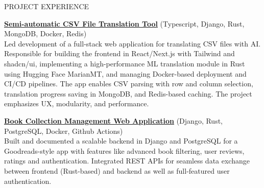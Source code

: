 \documentclass{resume} %
\begin{document}
\begin{rSection}{PROJECT EXPERIENCE}
\vspace{-1.25em}

\item \textbf{\href{https://github.com/Kerciu/csv-translation-tool} {Semi-automatic CSV File Translation Tool}} {(Typescript, Django, Rust, MongoDB, Docker, Redis)}\\  
Led development of a full-stack web application for translating CSV files with AI. Responsible for building the frontend in React/Next.js with Tailwind and shadcn/ui, implementing a high-performance ML translation module in Rust using Hugging Face MarianMT, and managing Docker-based deployment and CI/CD pipelines. The app enables CSV parsing with row and column selection, translation progress saving in MongoDB, and Redis-based caching. The project emphasizes UX, modularity, and performance.



\item \textbf{\href{https://github.com/Kerciu/book-management-app}{Book Collection Management Web Application}} {(Django, Rust, PostgreSQL, Docker, Github Actions)}\\
Built and documented a scalable backend in Django and PostgreSQL for a Goodreads-style app with features like advanced book filtering, user reviews, ratings and authentication. Integrated REST APIs for seamless data exchange between frontend (Rust-based) and backend as well as full-featured user authentication.


\end{rSection}
\end{document}
